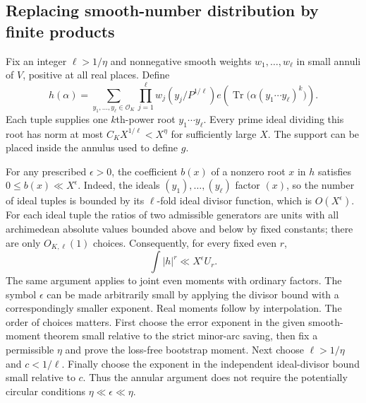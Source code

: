 \documentclass[11pt,reqno]{amsart}
\numberwithin{equation}{section}
\theoremstyle{definition}
\begin{document}
\subsection{Replacing smooth-number distribution by finite products}
Fix an integer $\ell>1/\eta$ and nonnegative smooth weights $w_1,\ldots,w_\ell$
in small annuli of $V$, positive at all real places.  Define
\[
 h(\alpha)=\sum_{y_1,\ldots,y_\ell\in\mathcal O_K}
 \prod_{j=1}^{\ell}w_j(y_j/P^{1/\ell})
 e\!\left(\operatorname {Tr}\bigl(\alpha(y_1\cdots y_\ell)^k\bigr)\right).
\]
Each tuple supplies one $k$th-power root $y_1\cdots y_\ell$.
Every prime ideal dividing this root has norm at most
$C_KX^{1/\ell}<X^\eta$ for sufficiently large $X$.
The support can be placed inside the annulus used to define $g$.

For any prescribed $\epsilon>0$, the coefficient $b(x)$ of a nonzero root $x$
in $h$ satisfies $0\le b(x)\ll X^\epsilon$.
Indeed, the ideals $(y_1),\ldots,(y_\ell)$ factor $(x)$, so the number of ideal
tuples is bounded by its $\ell$-fold ideal divisor function, which is $O(X^\epsilon)$.
For each ideal tuple the ratios of two admissible generators are units with
all archimedean absolute values bounded above and below by fixed constants;
there are only $O_{K,\ell}(1)$ choices.  Consequently, for every fixed even $r$,
\begin{equation}\label{eq:product-moment-domination}
 \int|h|^r\ll X^\epsilon U_r.
\end{equation}
The same argument applies to joint even moments with ordinary factors.
The symbol $\epsilon$ can be made arbitrarily small by applying the divisor bound
with a correspondingly smaller exponent.  Real moments follow by interpolation.
The order of choices matters.  First choose the error exponent in the given
smooth-moment theorem small relative to the strict minor-arc saving, then fix a
permissible $\eta$ and prove the loss-free bootstrap moment.  Next choose
$\ell>1/\eta$ and $c<1/\ell$.  Finally choose the exponent in the independent
ideal-divisor bound small relative to $c$.  Thus the annular argument does not
require the potentially circular conditions $\eta\ll\epsilon\ll\eta$.
\end{document}
